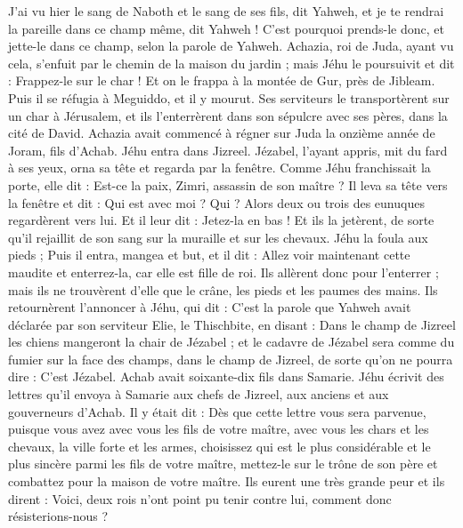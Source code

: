 \begin{multicols}{2}
J'ai vu hier le sang de Naboth et le sang de ses fils, dit Yahweh, et je te rendrai la pareille dans ce champ même, dit Yahweh ! C'est pourquoi prends-le donc, et jette-le dans ce champ, selon la parole de Yahweh.
Achazia, roi de Juda, ayant vu cela, s'enfuit par le chemin de la maison du jardin ; mais Jéhu le poursuivit et dit : Frappez-le sur le char ! Et on le frappa à la montée de Gur, près de Jibleam. Puis il se réfugia à Meguiddo, et il y mourut.
Ses serviteurs le transportèrent sur un char à Jérusalem, et ils l'enterrèrent dans son sépulcre avec ses pères, dans la cité de David.
Achazia avait commencé à régner sur Juda la onzième année de Joram, fils d'Achab.
Jéhu entra dans Jizreel. Jézabel, l'ayant appris, mit du fard à ses yeux, orna sa tête et regarda par la fenêtre.
Comme Jéhu franchissait la porte, elle dit : Est-ce la paix, Zimri, assassin de son maître ?
Il leva sa tête vers la fenêtre et dit : Qui est avec moi ? Qui ? Alors deux ou trois des eunuques regardèrent vers lui.
Et il leur dit : Jetez-la en bas ! Et ils la jetèrent, de sorte qu'il rejaillit de son sang sur la muraille et sur les chevaux. Jéhu la foula aux pieds ;
Puis il entra, mangea et but, et il dit : Allez voir maintenant cette maudite et enterrez-la, car elle est fille de roi.
Ils allèrent donc pour l'enterrer ; mais ils ne trouvèrent d'elle que le crâne, les pieds et les paumes des mains.
Ils retournèrent l'annoncer à Jéhu, qui dit : C'est la parole que Yahweh avait déclarée par son serviteur Elie, le Thischbite, en disant : Dans le champ de Jizreel les chiens mangeront la chair de Jézabel ;
et le cadavre de Jézabel sera comme du fumier sur la face des champs, dans le champ de Jizreel, de sorte qu'on ne pourra dire : C'est Jézabel.
\VerseOne{}Achab avait soixante-dix fils dans Samarie. Jéhu écrivit des lettres qu'il envoya à Samarie aux chefs de Jizreel, aux anciens et aux gouverneurs d'Achab. Il y était dit :
Dès que cette lettre vous sera parvenue, puisque vous avez avec vous les fils de votre maître, avec vous les chars et les chevaux, la ville forte et les armes,
choisissez qui est le plus considérable et le plus sincère parmi les fils de votre maître, mettez-le sur le trône de son père et combattez pour la maison de votre maître.
Ils eurent une très grande peur et ils dirent : Voici, deux rois n'ont point pu tenir contre lui, comment donc résisterions-nous ?

\end{multicols}
